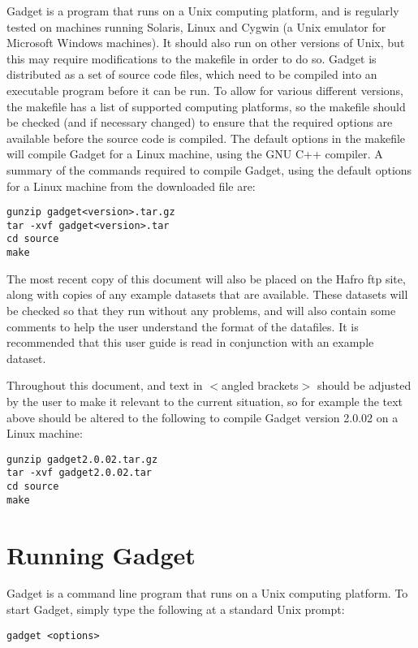 \documentclass [a4paper, 10pt]{book}
\begin{document}
\bigskip
Gadget is a program that runs on a Unix computing platform, and is regularly tested on machines running Solaris, Linux and Cygwin (a Unix emulator for Microsoft Windows machines).  It should also run on other versions of Unix, but this may require modifications to the makefile in order to do so.  Gadget is distributed as a set of source code files, which need to be compiled into an executable program before it can be run.  To allow for various different versions, the makefile has a list of supported computing platforms, so the makefile should be checked (and if necessary changed) to ensure that the required options are available before the source code is compiled.  The default options in the makefile will compile Gadget for a Linux machine, using the GNU C++ compiler.  A summary of the commands required to compile Gadget, using the default options for a Linux machine from the downloaded file are:

\begin{verbatim}
gunzip gadget<version>.tar.gz
tar -xvf gadget<version>.tar
cd source
make
\end{verbatim}

The most recent copy of this document will also be placed on the Hafro ftp site, along with copies of any example datasets that are available.  These datasets will be checked so that they run without any problems, and will also contain some comments to help the user understand the format of the datafiles.  It is recommended that this user guide is read in conjunction with an example dataset.

\bigskip
Throughout this document, and text in $<$angled brackets$>$ should be adjusted by the user to make it relevant to the current situation, so for example the text above should be altered to the following to compile Gadget version 2.0.02 on a Linux machine:

\begin{verbatim}
gunzip gadget2.0.02.tar.gz
tar -xvf gadget2.0.02.tar
cd source
make
\end{verbatim}

\section{Running Gadget}\label{sec:runninggadget}
Gadget is a command line program that runs on a Unix computing platform.  To start Gadget, simply type the following at a standard Unix prompt:

\begin{verbatim}
gadget <options>
\end{verbatim}
\end{document}
